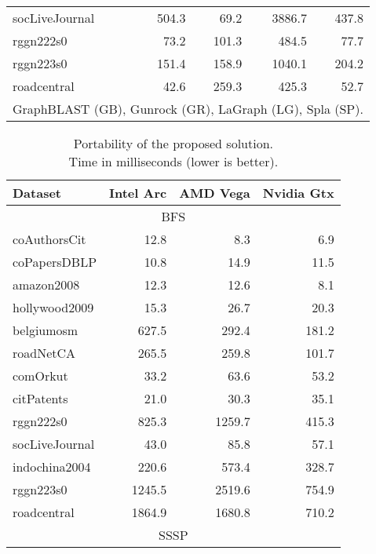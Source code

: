 \begin{table}[tbp]
\begin{center}
\begin{tabular}{|l|r|r|r|r|}
    \rowcolor{black!10} socLiveJournal&504.3&69.2&3886.7&437.8\\
    \rowcolor{black!2 } rggn222s0&73.2&101.3&484.5&77.7\\
    \rowcolor{black!10} rggn223s0&151.4&158.9&1040.1&204.2\\
    \rowcolor{black!2 } roadcentral&42.6&259.3&425.3&52.7\\
    \hline
    \hline
    \multicolumn{5}{l}{GraphBLAST (GB), Gunrock (GR), LaGraph (LG), Spla (SP).} \\
    \end{tabular}
    \label{rq1_table}
\end{center}
\end{table}

\begin{table}[tbp]
\caption{Portability of the proposed solution.\\Time in milliseconds (lower is better).} 
\begin{center}
    \begin{tabular}{|l|r|r|r|}
    \hline
    Dataset & Intel Arc & AMD Vega & Nvidia Gtx\\
    \hline
    \hline
    \multicolumn{4}{|c|}{BFS} \\
    \hline
    \rowcolor{black!10} coAuthorsCit&12.8&8.3&6.9\\
    \rowcolor{black!2 } coPapersDBLP&10.8&14.9&11.5\\
    \rowcolor{black!10} amazon2008&12.3&12.6&8.1\\
    \rowcolor{black!2 } hollywood2009&15.3&26.7&20.3\\
    \rowcolor{black!10} belgiumosm&627.5&292.4&181.2\\
    \rowcolor{black!2 } roadNetCA&265.5&259.8&101.7\\
    \rowcolor{black!10} comOrkut&33.2&63.6&53.2\\
    \rowcolor{black!2 } citPatents&21.0&30.3&35.1\\
    \rowcolor{black!10} rggn222s0&825.3&1259.7&415.3\\
    \rowcolor{black!2 } socLiveJournal&43.0&85.8&57.1\\
    \rowcolor{black!10} indochina2004&220.6&573.4&328.7\\
    \rowcolor{black!2 } rggn223s0&1245.5&2519.6&754.9\\
    \rowcolor{black!10} roadcentral&1864.9&1680.8&710.2\\
    \hline
    \hline
    \multicolumn{4}{|c|}{SSSP} \\

\end{tabular}
\end{center}
\end{table}

